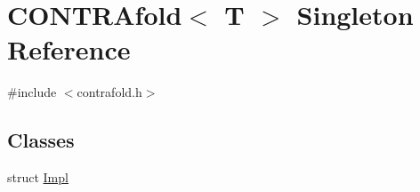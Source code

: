 \hypertarget{class_c_o_n_t_r_afold}{\section{C\+O\+N\+T\+R\+Afold$<$ T $>$ Singleton Reference}
\label{class_c_o_n_t_r_afold}
}


{\ttfamily \#include $<$contrafold.\+h$>$}

\subsection*{Classes}
\begin{DoxyCompactItemize}
\item 
struct \hyperlink{struct_c_o_n_t_r_afold_1_1_impl}{Impl}
\end{DoxyCompactItemize}
